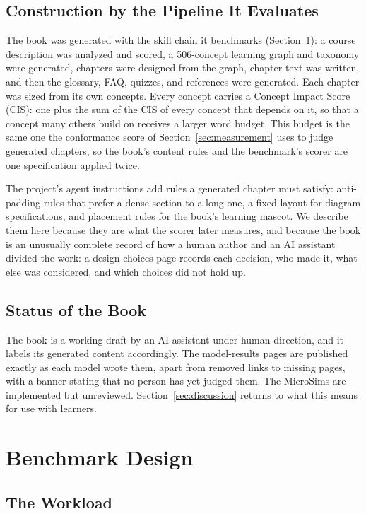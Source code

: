 \documentclass[11pt]{article}
\begin{document}
\subsection{Construction by the Pipeline It Evaluates}

The book was generated with the skill chain it benchmarks (Section~\ref{sec:design}): a course description was analyzed and scored, a 506-concept learning graph and taxonomy were generated, chapters were designed from the graph, chapter text was written, and then the glossary, FAQ, quizzes, and references were generated. Each chapter was sized from its own concepts. Every concept carries a Concept Impact Score (CIS): one plus the sum of the CIS of every concept that depends on it, so that a concept many others build on receives a larger word budget. This budget is the same one the conformance score of Section~\ref{sec:measurement} uses to judge generated chapters, so the book's content rules and the benchmark's scorer are one specification applied twice.

The project's agent instructions add rules a generated chapter must satisfy: anti-padding rules that prefer a dense section to a long one, a fixed layout for diagram specifications, and placement rules for the book's learning mascot. We describe them here because they are what the scorer later measures, and because the book is an unusually complete record of how a human author and an AI assistant divided the work: a design-choices page records each decision, who made it, what else was considered, and which choices did not hold up.

\subsection{Status of the Book}

The book is a working draft by an AI assistant under human direction, and it labels its generated content accordingly. The model-results pages are published exactly as each model wrote them, apart from removed links to missing pages, with a banner stating that no person has yet judged them. The MicroSims are implemented but unreviewed. Section~\ref{sec:discussion} returns to what this means for use with learners.

\section{Benchmark Design}
\label{sec:design}

\subsection{The Workload}
\end{document}
